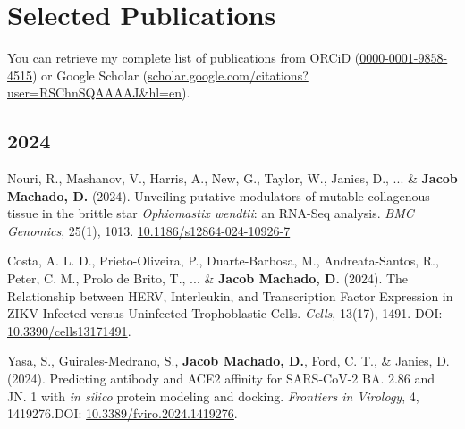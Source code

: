 \documentclass[11pt, letterpaper, sans]{moderncv}
\begin{document}

\section{Selected Publications}

You can retrieve my complete list of publications from ORCiD (\href{https://orcid.org/0000-0001-9858-4515}{0000-0001-9858-4515}) or Google Scholar (\href{https://scholar.google.com/citations?user=RSChnSQAAAAJ\&hl=en}{scholar.google.com/citations?user=RSChnSQAAAAJ\&hl=en}).



\subsection{2024}

	{\setlength{\parskip}{.5em}\renewcommand{\baselinestretch}{2.0}\begin{hangparas}{.25in}{1}

		Nouri, R., Mashanov, V., Harris, A., New, G., Taylor, W., Janies, D., ... \& \textbf{Jacob Machado, D.} (2024). Unveiling putative modulators of mutable collagenous tissue in the brittle star \textit{Ophiomastix wendtii}: an RNA-Seq analysis. \textit{BMC Genomics}, 25(1), 1013. \href{https://doi.org/10.1186/s12864-024-10926-7}{10.1186/s12864-024-10926-7}

		Costa, A. L. D., Prieto-Oliveira, P., Duarte-Barbosa, M., Andreata-Santos, R., Peter, C. M., Prolo de Brito, T., ... \& \textbf{Jacob Machado, D.} (2024). The Relationship between HERV, Interleukin, and Transcription Factor Expression in ZIKV Infected versus Uninfected Trophoblastic Cells. \textit{Cells}, 13(17), 1491. DOI: \href{https://doi.org/10.3390/cells13171491}{10.3390/cells13171491}.

        Yasa, S., Guirales-Medrano, S., \textbf{Jacob Machado, D.}, Ford, C. T., \& Janies, D. (2024). Predicting antibody and ACE2 affinity for SARS-CoV-2 BA. 2.86 and JN. 1 with \textit{in silico} protein modeling and docking. \textit{Frontiers in Virology}, 4, 1419276.DOI: \href{https://doi.org/10.3389/fviro.2024.1419276}{10.3389/fviro.2024.1419276}.

	\end{hangparas}}
\end{document}
